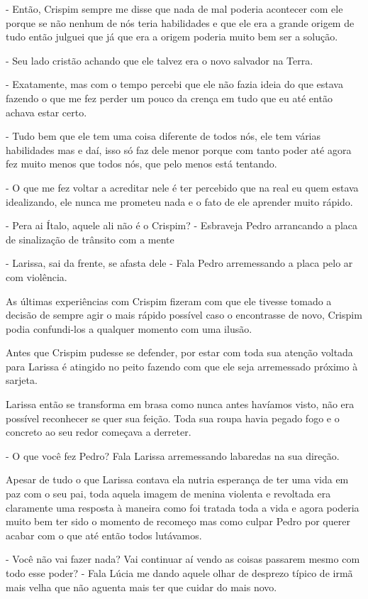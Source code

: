 - Então, Crispim sempre me disse que nada de mal poderia acontecer com ele porque se não nenhum de nós teria habilidades e que ele era a grande origem de tudo então julguei que já que era a origem poderia muito bem ser a solução.

- Seu lado cristão achando que ele talvez era o novo salvador na Terra.

- Exatamente, mas com o tempo percebi que ele não fazia ideia do que estava fazendo o que me fez perder um pouco da crença em tudo que eu até então achava estar certo.

- Tudo bem que ele tem uma coisa diferente de todos nós, ele tem várias habilidades mas e daí, isso só faz dele menor porque com tanto poder até agora fez muito menos que todos nós, que pelo menos está tentando.

- O que me fez voltar a acreditar nele é ter percebido que na real eu quem estava idealizando, ele nunca me prometeu nada e o fato de ele aprender muito rápido.

- Pera ai Ítalo, aquele ali não é o Crispim? - Esbraveja Pedro arrancando a placa de sinalização de trânsito com a mente

- Larissa, sai da frente, se afasta dele - Fala Pedro arremessando a placa pelo ar com violência.

As últimas experiências com Crispim fizeram com que ele tivesse tomado a decisão de sempre agir o mais rápido possível caso o encontrasse de novo, Crispim podia confundi-los a qualquer momento com uma ilusão.

Antes que Crispim pudesse se defender, por estar com toda sua atenção voltada para Larissa é atingido no peito fazendo com que ele seja arremessado próximo à sarjeta.

Larissa então se transforma em brasa como nunca antes havíamos visto, não era possível reconhecer se quer sua feição. Toda sua roupa havia pegado fogo e o concreto ao seu redor começava a derreter.

- O que você fez Pedro? Fala Larissa arremessando labaredas na sua direção.

Apesar de tudo o que Larissa contava ela nutria esperança de ter uma vida em paz com o seu pai, toda aquela imagem de menina violenta e revoltada era claramente uma resposta à maneira como foi tratada toda a vida e agora poderia muito bem ter sido o momento de recomeço mas como culpar Pedro por querer acabar com o que até então todos lutávamos.

- Você não vai fazer nada? Vai continuar aí vendo as coisas passarem mesmo com todo esse poder? - Fala Lúcia me dando aquele olhar de desprezo típico de irmã mais velha que não aguenta mais ter que cuidar do mais novo.

